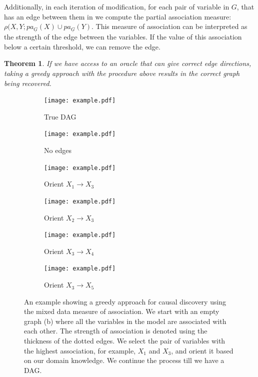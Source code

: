 \documentclass{uai2025} %
\newtheorem{theorem}{Theorem}
\begin{document}
Additionally, in each iteration of modification, for each pair of variable in $
G $, that has an edge between them in we compute the partial association
measure: $ \rho(X, Y; pa_{\underline{G}}(X) \cup pa_{\underline{G}}(Y) $. This
measure of association can be interpreted as the strength of the edge between
the variables. If the value of this association below a certain threshold, we
can remove the edge.

\begin{theorem}
	If we have access to an oracle that can give correct edge directions, taking a
	greedy approach with the procedure above results in the correct graph
	being recovered. 
\end{theorem}

\begin{figure}[t!]
	\begin{subfigure}{0.17 \textwidth}
		\texttt{[image: example.pdf]}
		\caption{True DAG}
	\end{subfigure}%
	\begin{subfigure}{0.17 \textwidth}
		\texttt{[image: example.pdf]}
		\caption{No edges}
	\end{subfigure}%
	\begin{subfigure}{0.17 \textwidth}
		\texttt{[image: example.pdf]}
		\caption{Orient $ X_1 \rightarrow X_3 $}
	\end{subfigure}
	\begin{subfigure}{0.17 \textwidth}
		\texttt{[image: example.pdf]}
		\caption{Orient $ X_2 \rightarrow X_3 $}
	\end{subfigure}%
	\begin{subfigure}{0.17 \textwidth}
		\texttt{[image: example.pdf]}
		\caption{Orient $ X_3 \rightarrow X_4 $}
	\end{subfigure}%
	\begin{subfigure}{0.17 \textwidth}
		\texttt{[image: example.pdf]}
		\caption{Orient $ X_3 \rightarrow X_5 $}
	\end{subfigure}
	\caption{An example showing a greedy approach for causal discovery using the mixed data measure of association. We start with an empty graph (b) where all the variables in the model are associated with each other. The strength of association is denoted using the thickness of the dotted edges. We select the pair of variables with the highest association, for example, $X_1$ and $X_3$, and orient it based on our domain knowledge. We continue the process till we have a DAG.
	}
\end{figure}
\end{document}
